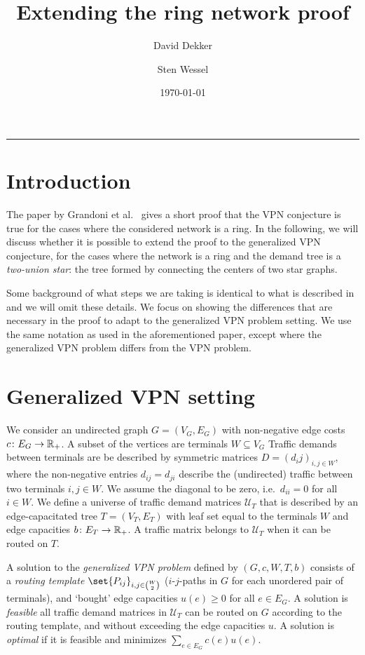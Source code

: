 \documentclass[11pt]{article}
\title{Extending the ring network proof}
\author{David Dekker \and Sten Wessel}
\date{\today}
\theoremstyle{definition}
\begin{document}
    \maketitle
    \hrule
    \medskip

    \section{Introduction}
    The paper by Grandoni et al.~\cite{grandoni2008short} gives a short proof that the VPN conjecture is true for the cases where the considered network is a ring.
    In the following, we will discuss whether it is possible to extend the proof to the generalized VPN conjecture, for the cases where the network is a ring and the demand tree is a \emph{two-union star}: the tree formed by connecting the centers of two star graphs.

    Some background of what steps we are taking is identical to what is described in \cite{grandoni2008short} and we will omit these details.
    We focus on showing the differences that are necessary in the proof to adapt to the generalized VPN problem setting.
    We use the same notation as used in the aforementioned paper, except where the generalized VPN problem differs from the VPN problem.

    \section{Generalized VPN setting}
    We consider an undirected graph $G = (V_G, E_G)$ with non-negative edge costs $c\colon E_G \to \mathbb{R}_+$.
    A subset of the vertices are terminals $W \subseteq V_G$
    Traffic demands between terminals are be described by symmetric matrices $D = (d_ij)_{i,j \in W}$, where the non-negative entries $d_{ij} = d_{ji}$ describe the (undirected) traffic between two terminals $i,j \in W$.
    We assume the diagonal to be zero, i.e.\ $d_{ii} = 0$ for all $i \in W$.
    We define a universe of traffic demand matrices $\mathcal U_T$ that is described by an edge-capacitated tree $T = (V_T, E_T)$ with leaf set equal to the terminals $W$ and edge capacities $b\colon E_T \to \mathbb{R}_+$.
    A traffic matrix belongs to $\mathcal U_T$ when it can be routed on $T$.

    A solution to the \emph{generalized VPN problem} defined by $(G, c, W, T, b)$ consists of a \emph{routing template} $\set{P_{ij}}_{i,j \in \binom{W}{2}}$ ($i$-$j$-paths in $G$ for each unordered pair of terminals), and `bought' edge capacities $u(e) \ge 0$ for all $e \in E_G$.
    A solution is \emph{feasible} all traffic demand matrices in $\mathcal U_T$ can be routed on $G$ according to the routing template, and without exceeding the edge capacities $u$.
    A solution is \emph{optimal} if it is feasible and minimizes $\sum_{e \in E_G} c(e) u(e)$.
\end{document}
